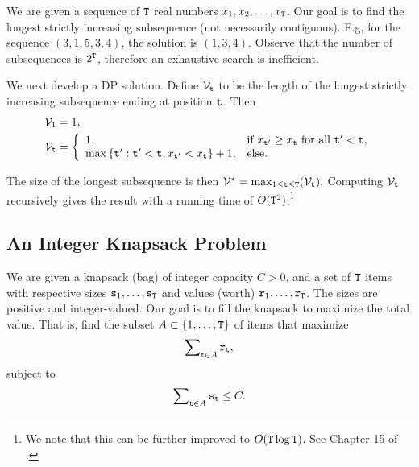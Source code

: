 We are given a sequence of ${\tt T}$ real numbers ${x_1},{x_2}, \ldots ,{x_{{\tt T}}}$. Our goal is to find the longest strictly increasing subsequence (not necessarily contiguous).
E.g, for the sequence $(3,1,5,3,4)$, the solution is $(1,3,4)$.
Observe that the number of subsequences is ${2^{{\tt T}}}$, therefore an exhaustive search is inefficient.

We next develop a DP solution. Define  ${\mathcal{V}_{{\tt t}}}$ to be the length of the longest strictly increasing subsequence ending at position ${\tt t}$.
Then 
\begin{equation*}
\begin{split}
    {\Value_1} &= 1, \\
    \Value_{\ttime} &= \left\{\begin{array}{ll}
  1, & \text{if } x_{\ttime'}\geq x_{\ttime} \text{ for all } \ttime'<\ttime, \\
  \max \left\{{\value_{\ttime'} : \ttime'<\ttime, x_{\ttime'}<x_{\ttime}}\right\}+1,& \text{else}. \end{array}\right. 
\end{split}
\end{equation*}

The size of the longest subsequence is then $\mathcal{V}^* = {\max _{1 \le {\tt t} \le {\tt T}}}({\mathcal{V}_{{\tt t}}}).$ 
Computing ${\mathcal{V}_{{\tt t}}}$ recursively gives the result with a running time of $O({{\tt T}^2})$.\footnote{We note that this can be further improved to $O({\tt T}\log {\tt T})$. See Chapter 15 of
\cite{BookCormenLRS2009}.}


\subsection*{An Integer Knapsack Problem}

We are given a knapsack (bag) of integer capacity $C > 0$, and a set of ${\tt T}$ items with respective sizes ${{\tt s}_1}, \ldots ,{{\tt s}_{{\tt T}}}$ and values (worth) ${{\tt r}_1}, \ldots ,{{\tt r}_{{\tt T}}}$. The sizes are positive and integer-valued. Our goal is to fill the knapsack to maximize the total value. That is, find the subset $A \subset \{ 1, \ldots ,{\tt T}\} $ of items that maximize \[\sum\nolimits_{{\tt t} \in A} {{{\tt r}_{{\tt t}}}} ,\] subject to  \[\sum\nolimits_{{\tt t} \in A} {{{\tt s}_{\tt t}}}  \le C.\]


